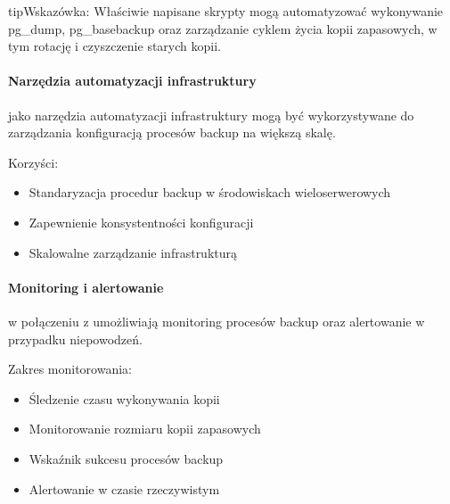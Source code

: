 \documentclass[letterpaper,10pt,polish]{sphinxmanual}
\begin{document}
\begin{sphinxadmonition}{tip}{Wskazówka:}
\sphinxAtStartPar
Właściwie napisane skrypty mogą automatyzować wykonywanie pg\_dump, pg\_basebackup oraz zarządzanie cyklem życia kopii zapasowych, w tym rotację i czyszczenie starych kopii.
\end{sphinxadmonition}


\paragraph{Narzędzia automatyzacji infrastruktury}
\label{\detokenize{rozdzial2/Kopie_zapasowe_i_odzyskiwanie_danych/kopie_zapasowe_i_odzyskiwanie_danych:narzedzia-automatyzacji-infrastruktury}}
\sphinxAtStartPar
{} jako narzędzia automatyzacji infrastruktury mogą być wykorzystywane do zarządzania konfiguracją procesów backup na większą skalę.

\sphinxAtStartPar
Korzyści:
\begin{itemize}
\item {} 
\sphinxAtStartPar
Standaryzacja procedur backup w środowiskach wieloserwerowych

\item {} 
\sphinxAtStartPar
Zapewnienie konsystentności konfiguracji

\item {} 
\sphinxAtStartPar
Skalowalne zarządzanie infrastrukturą

\end{itemize}


\paragraph{Monitoring i alertowanie}
\label{\detokenize{rozdzial2/Kopie_zapasowe_i_odzyskiwanie_danych/kopie_zapasowe_i_odzyskiwanie_danych:monitoring-i-alertowanie}}
\sphinxAtStartPar
{} w połączeniu z  umożliwiają monitoring procesów backup oraz alertowanie w przypadku niepowodzeń.

\sphinxAtStartPar
Zakres monitorowania:
\begin{itemize}
\item {} 
\sphinxAtStartPar
Śledzenie czasu wykonywania kopii

\item {} 
\sphinxAtStartPar
Monitorowanie rozmiaru kopii zapasowych

\item {} 
\sphinxAtStartPar
Wskaźnik sukcesu procesów backup

\item {} 
\sphinxAtStartPar
Alertowanie w czasie rzeczywistym

\end{itemize}
\end{document}
